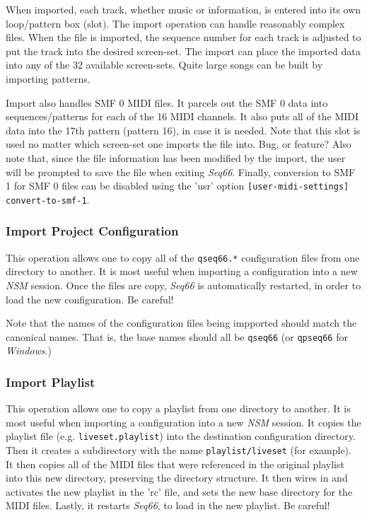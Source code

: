    When imported, each track, whether music or information,
   is entered into its own loop/pattern box (slot).
   The import operation can handle reasonably complex files.
   When the file is imported, the sequence number for each track is
   adjusted to put the track into the desired screen-set.
   The import can place the imported data into any of the 32 available
   screen-sets.  Quite large songs can be built by importing patterns.

   Import also handles SMF 0 MIDI files.  It parcels out the SMF 0 data
   into sequences/patterns for each of the 16 MIDI channels.  It also puts
   all of the MIDI data into the 17th pattern (pattern 16), in case it is
   needed.  Note that this slot is used no matter which screen-set one imports
   the file into.  Bug, or feature?
   Also note that, since the file information has been modified by the import,
   the user will be prompted to save the file when exiting \textsl{Seq66}.
   Finally, conversion to SMF 1 for SMF 0 files can be disabled using the
   'usr' option \texttt{[user-midi-settings] convert-to-smf-1}.

\subsubsection{Import Project Configuration}
\label{subsubsec:midi_export_file_import_project}

   This operation allows one to copy all of the \texttt{qseq66.*} configuration
   files from one directory to another.  It is most useful when
   importing a configuration into a new \textsl{NSM} session.
   Once the files are copy, \textsl{Seq66} is automatically restarted,
   in order to load the new configuration.  Be careful!

   Note that the names of the configuration files being impported should
   match the canonical names.  That is, the base names should all be
   \texttt{qseq66} (or \texttt{qpseq66} for \textsl{Windows}.)

\subsubsection{Import Playlist}
\label{subsubsec:midi_export_file_import_playlist}

   This operation allows one to copy a playlist
   from one directory to another.  It is most useful when
   importing a configuration into a new \textsl{NSM} session.
   It copies the playlist file (e.g. \texttt{liveset.playlist})
   into the destination configuration directory.
   Then it creates a subdirectory with the name
   \texttt{playlist/liveset} (for example).
   It then copies all of the MIDI files that were referenced in the
   original playlist into this new directory, preserving
   the directory structure.
   It then wires in and activates the new playlist in the
   'rc' file, and sets the new base directory for the MIDI files.
   Lastly, it restarts \textsl{Seq66}, to load in the new playlist.
   Be careful!


